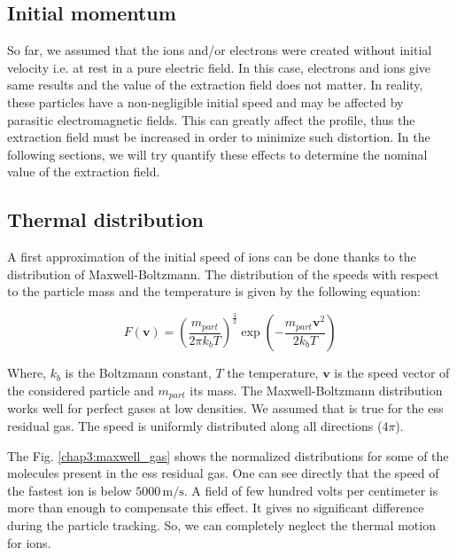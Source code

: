 \begin{refsection}
  \section{Initial momentum}
  So far, we assumed that the ions and/or electrons were created without initial velocity i.e. at rest in a pure electric field. In this case, electrons and ions give same results and the value of the extraction field does not matter. In reality, these particles have a non-negligible initial speed and may be affected by parasitic electromagnetic fields. This can greatly affect the profile, thus the extraction field must be increased in order to minimize such distortion. In the following sections, we will try quantify these effects to determine the nominal value of the extraction field.

  \subsection{Thermal distribution}
  A first approximation of the initial speed of ions can be done thanks to the distribution of Maxwell-Boltzmann. The distribution of the speeds with respect to the particle mass and the temperature is given by the following equation:

  \begin{equation}
    F(\boldsymbol{v}) = \left(\frac{m_{part}}{2 \pi k_{b} T}\right)^{\frac{3}{2}}\exp\left(-\frac{m_{part}\boldsymbol{v}^{2}}{2 k_{b} T}\right)
  \end{equation}
  
  Where, $k_{b}$ is the Boltzmann constant, $T$ the temperature, $\boldsymbol{v}$ is the speed vector of the considered particle and $m_{part}$ its mass. The Maxwell-Boltzmann distribution works well for perfect gases at low densities. We assumed that is true for the \acrshort{ess} residual gas. The speed is uniformly distributed along all directions ($4\pi$).

  The Fig. \ref{chap3:maxwell_gas} shows the normalized distributions for some of the molecules present in the \acrshort{ess} residual gas. One can see directly that the speed of the fastest ion is below $5000\,\mathrm{m/s}$. A field of few hundred volts per centimeter is more than enough to compensate this effect. It gives no significant difference during the particle tracking. So, we can completely neglect the thermal motion for ions.


\end{refsection}
